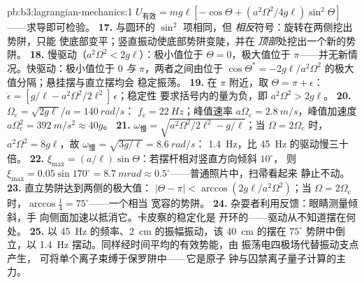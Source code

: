 \begin{solution}{pb:b3:lagrangian-mechanics:1}
$U_{\text{有效}} = mg\ell[-\cos\Theta + (a^2\Omega^2/4g\ell)
\sin^2\Theta]$——求导即可检验。
\textbf{17.} 与圆环的 $\sin^2$ 项相同，但
\emph{相反}符号：旋转在两侧挖出势阱，只能
使底部变平；竖直振动使底部势阱变陡，并在
\emph{顶部}处挖出一个新的势阱。
\textbf{18.} 慢驱动（$a^2\Omega^2 < 2g\ell$）：极小值位于 $\Theta =
0$，极大值位于 $\pi$——并无新情况。快驱动：极小值位于 $0$
\emph{与} $\pi$，两者之间由位于 $\cos\Theta^* =
-2g\ell/a^2\Omega^2$ 的极大值分隔；悬挂摆与直立摆均会
稳定振荡。
\textbf{19.} 在 $\pi$ 附近，取 $\Theta = \pi + \epsilon$：
$\ddot\epsilon = [g/\ell - a^2\Omega^2/2\ell^2]\,\epsilon$；稳定性
要求括号内的量为负，即 $a^2\Omega^2 > 2g\ell$。
\textbf{20.} $\Omega_{\text{c}} = \sqrt{2g\ell}/a = \qty{140}{rad/s}$：
$f_{\text{c}} = \qty{22}{Hz}$；峰值速率 $a\Omega_{\text{c}} =
\qty{2.8}{m/s}$，峰值加速度 $a\Omega_{\text{c}}^2 =
\qty{392}{m/s^2} \approx 40g$。
\textbf{21.} $\omega_{\text{慢}} = \sqrt{a^2\Omega^2/2\ell^2 -
g/\ell}$；当 $\Omega = 2\Omega_{\text{c}}$ 时，$a^2\Omega^2 = 8g\ell$，故
$\omega_{\text{慢}} = \sqrt{3g/\ell} = \qty{8.6}{rad/s}$：
\qty{1.4}{Hz}，比 \qty{45}{Hz} 的驱动慢三十倍。
\textbf{22.} $\xi_{\max} = (a/\ell)\sin\Theta$：若摆杆相对竖直方向倾斜 $10^\circ$，
则 $\xi_{\max} = 0.05\sin170^\circ = \qty{8.7}{mrad}
\approx 0.5^\circ$——普通照片中，扫帚看起来
静止不动。
\textbf{23.} 直立势阱达到两侧的极大值：
$|\Theta - \pi| < \arccos(2g\ell/a^2\Omega^2)$；当 $\Omega =
2\Omega_{\text{c}}$ 时，$\arccos\tfrac14 = 75^\circ$——一个相当
宽容的势阱。
\textbf{24.} 杂耍者利用反馈：眼睛测量倾斜，手
向侧面加速以抵消它。卡皮察的稳定化是
开环的——驱动从不知道摆在何处。
\textbf{25.} 以 \qty{45}{Hz} 的频率、\qty{2}{cm} 的振幅振动，该
\qty{40}{cm} 的摆在 $75^\circ$ 势阱中倒立，以
\qty{1.4}{Hz} 摆动。同样经时间平均的有效势能，由
振荡电四极场代替振动支点产生，
可将单个离子束缚于保罗阱中——它是原子
钟与囚禁离子量子计算的主力。
\end{solution}
